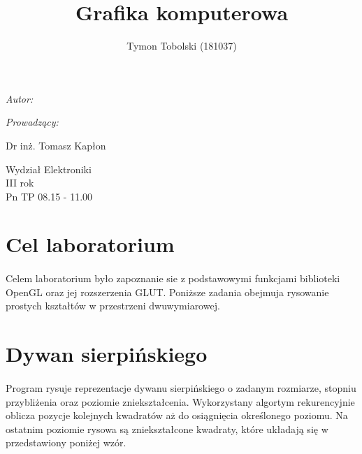 \documentclass[wide,a4paper,titlepage,12pt] {article}
\title{Grafika komputerowa}
\author{Tymon Tobolski (181037)}
\makeatletter
\renewcommand{\maketitle}{
\begin{titlepage}
  \begin{center}
    \vspace*{3cm}
    \LARGE \@title \par
    \vspace{2cm}
    \textit{\small Autor:}\par
    \normalsize \@author\par \normalsize
    \vspace{3cm}
    \textit{\small Prowadzący:}\par
    Dr inż. Tomasz Kapłon \par
    \vspace{2cm}
    Wydział Elektroniki\\ III rok\\ Pn TP 08.15 - 11.00\par
    \vspace{4cm}
    \small \@date
  \end{center}
\end{titlepage}
}
\makeatother
\begin{document}
\maketitle
  \section{Cel laboratorium}
  \paragraph{}
  Celem laboratorium było zapoznanie sie z podstawowymi funkcjami biblioteki OpenGL oraz jej rozszerzenia GLUT.
  Poniższe zadania obejmuja rysowanie prostych kształtów w przestrzeni dwuwymiarowej.

  \section{Dywan sierpińskiego}
  \paragraph{}
  Program rysuje reprezentacje dywanu sierpińskiego
  o zadanym rozmiarze, stopniu przybliżenia oraz poziomie zniekształcenia.
  Wykorzystany algortym rekurencyjnie oblicza pozycje kolejnych kwadratów aż do
  osiągnięcia określonego poziomu. Na ostatnim poziomie rysowa są zniekształcone kwadraty, które układają się
  w przedstawiony poniżej wzór.

  \paragraph{}

  
\end{document}
